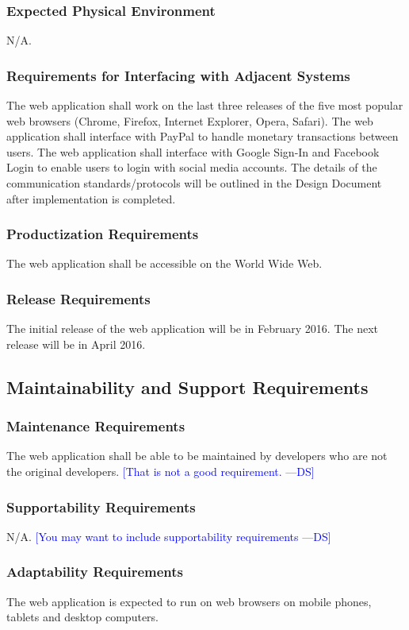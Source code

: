 \documentclass[12pt]{article}
\newcommand{\authornote}[3]{\textcolor{#1}{[#3 ---#2]}}
\newcommand{\authornote}[3]{}
\newcommand{\ds}[1]{\authornote{blue}{DS}{#1}}
\begin{document}
{\subsubsection{Expected Physical Environment}
N/A.
\subsubsection{Requirements for Interfacing with Adjacent Systems}
The web application shall work on the last three releases of the five most 
popular web browsers (Chrome, Firefox, Internet Explorer, Opera, Safari). The 
web application shall interface with PayPal to handle monetary transactions 
between users. The web application shall interface with Google Sign-In and 
Facebook Login to enable users to login with social media accounts. The details 
of the communication standards/protocols will be outlined in the Design Document 
after implementation is completed.
\subsubsection{Productization Requirements}
The web application shall be accessible on the World Wide Web.
\subsubsection{Release Requirements}
The initial release of the web application will be in February 2016. The next 
release will be in April 2016.
\subsection{Maintainability and Support Requirements}
\subsubsection{Maintenance Requirements}
The web application shall be able to be maintained by developers who are not the 
original developers.
\ds{That is not a good requirement.}
\subsubsection{Supportability Requirements}
N/A. 
\ds{You may want to include supportability requirements}

\subsubsection{Adaptability Requirements}
The web application is expected to run on web browsers on mobile phones, tablets 
and desktop computers.
}
\end{document}
